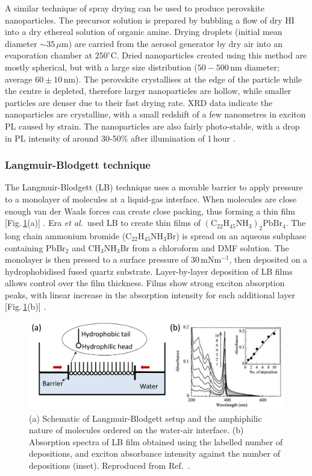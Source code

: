 A similar technique of spray drying can be used to produce perovskite nanoparticles. The precursor solution is prepared by bubbling a flow of dry HI into a dry ethereal solution of organic amine. Drying droplets (initial mean diameter $\sim 35\,\mu$m) are carried from the aerosol generator by dry air into an evaporation chamber at $250^{\circ}$C. Dried nanoparticles created using this method are mostly spherical, but with a large size distribution ($50-500$\,nm diameter; average $60\pm10$\,nm). The perovskite crystallises at the edge of the particle while the centre is depleted, therefore larger nanoparticles are hollow, while smaller particles are denser due to their fast drying rate. XRD data indicate the nanoparticles are crystalline, with a small redshift of a few nanometres in exciton PL caused by strain. The nanoparticles are also fairly photo-stable, with a drop in PL intensity of around 30-50\% after illumination of 1\,hour \cite{Audebert2009a}.

\subsubsection {Langmuir-Blodgett technique}
The Langmuir-Blodgett (LB) technique uses a movable barrier to apply pressure to a monolayer of molecules at a liquid-gas interface. When molecules are close enough van der Waals forces can create close packing, thus forming a thin film [Fig.\,\ref{2Fig6}(a)] \cite{Mitzi2001b}. Era \textit{et al.}\ used LB to create thin films of $(\textrm{C}_{22}\textrm{H}_{45}\textrm{NH}_3)_2\textrm{PbBr}_4$. The long chain ammonium bromide ($\textrm{C}_{22}\textrm{H}_{45}\textrm{NH}_3$Br) is spread on an aqueous subphase containing Pb$\textrm{Br}_2$ and $\textrm{CH}_3\textrm{NH}_3$Br from a chloroform and DMF solution. The monolayer is then pressed to a surface pressure of 30\,mN$\textrm{m}^{-1}$, then deposited on a hydrophobidised fused quartz substrate. Layer-by-layer deposition of LB films allows control over the film thickness. Films show strong exciton absorption peaks, with linear increase in the absorption intensity for each additional layer [Fig.\,\ref{2Fig6}(b)] \cite{Era2000}.
\begin{figure} [h!]
\centering
\includegraphics[width=\textwidth]{Fig6}
\caption{(a) Schematic of Langmuir-Blodgett setup and the amphiphilic nature of molecules ordered on the water-air interface. (b) Absorption spectra of LB film obtained using the labelled number of depositions, and exciton absorbance intensity against the number of depositions (inset). Reproduced from Ref.~\cite{Era2000}.}
\label{2Fig6}
\end{figure}

